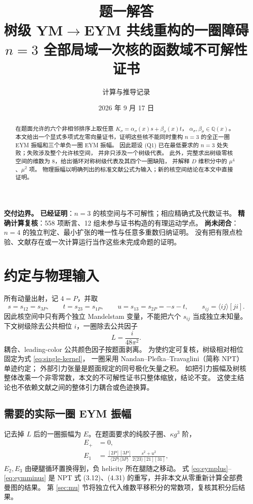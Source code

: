 \documentclass[UTF8,a4paper,11pt,fontset=fandol]{ctexart}
\title{\color{ink}\bfseries 题一解答\\[5pt]\Large 树级 YM$\to$EYM 共线重构的一圈障碍\\[4pt]\large $n=3$ 全部局域一次核的函数域不可解性证书}
\author{计算与推导记录}
\date{2026 年 9 月 17 日}
\newcommand{\ang}[1]{\langle #1\rangle}
\newcommand{\sq}[1]{[#1]}
\newcommand{\QQ}{\mathbb Q}
\newcommand{\proved}{\textbf{已经证明}}
\newcommand{\openpart}{\textbf{尚未闭合}}
\begin{document}
\maketitle
\begin{abstract}
在题面允许的六个非相邻排序上取任意
$K_\sigma=\alpha_\sigma(x)s+\beta_\sigma(x)t$，
$\alpha_\sigma,\beta_\sigma\in\QQ(x)$。
本文给出一个显式多项式左零向量证书，证明这些核不能同时重构
$n=3$ 的全正一圈 EYM 振幅和三个单负一圈 EYM 振幅。
因此题设 (Q1) 已在最低要求的 $n=3$ 处失败；失败涉及整个允许核空间，
并非只涉及一个树级代表。
此外，完整求出树级零核空间的维数为 $8$，给出循环对称树级代表及其四个一圈缺陷，
并解释 $D$ 维积分中的 $\mu^4$、$\mu^2$ 项。
物理振幅以明确列出的标准文献公式为输入；新的核空间结论在本文中直接证明。
\end{abstract}

\noindent\textbf{交付边界。}
\proved：$n=3$ 的核空间与不可解性；相应精确式及代数证书。
\textbf{精确计算复核}：558 项断言、12 组未参与证书构造的有理运动学点。
\openpart：$n=4$ 的独立判定、最小扩张的唯一性与任意多重数归纳证明。
没有把有限点检验、文献存在或一次计算运行当作这些未完成命题的证明。

\tableofcontents
\newpage
\section{约定与物理输入}

所有动量出射，记 $4=P$，并取
\begin{equation}
 s=s_{12}=s_{3P},\qquad t=s_{23}=s_{1P},\qquad
 u=s_{13}=s_{2P}=-s-t,\qquad s_{ij}=\ang{ij}\sq{ji}.
\end{equation}
因此核空间中只有两个独立 Mandelstam 变量，不能把六个 $s_{ij}$ 当成独立未知量。
下文树级除去公共相位 $i$，一圈除去公共因子
\begin{equation}
 L=\frac{i}{48\pi^2}.
\end{equation}
耦合、leading-color 公共颜色因子按题面剥离。
为使约定可复核，树级相对相位固定为式 \eqref{eq:single-kernel}，
一圈采用 Nandan--Plefka--Travaglini（简称 NPT）单迹约定；
外部引力张量是题面规定的同号极化矢量之积。
如把引力振幅及树核整体改乘一个非零常数，本文的不可解性证书只整体缩放，结论不变。
这使主结论也不依赖文献之间的整体引力耦合或色迹换算。

\subsection{需要的实际一圈 EYM 振幅}
记去掉 $L$ 后的一圈振幅为 $E$。在题面要求的纯胶子圈、$\kappa g^3$ 阶，
\begin{align}
 E_+&=0,\label{eq:eymplus}\\
 E_1&=\frac{\sq{2P}\sq{3P}}{\ang{2P}\ang{3P}}
       \frac{s^2+u^2}{2\ang{23}\sq{21}\sq{31}},\label{eq:eymminus}
\end{align}
$E_2,E_3$ 由硬腿循环置换得到，负 helicity 所在腿随之移动。
式 \eqref{eq:eymplus}--\eqref{eq:eymminus} 是 NPT
式 (3.12)、(4.31) 的重写\cite{NPT}，并非本文从零重新计算全部费曼图的结果。
第 \ref{sec:mu} 节将独立代入维数平移积分的常数项，复核其积分后结果。
\end{document}

